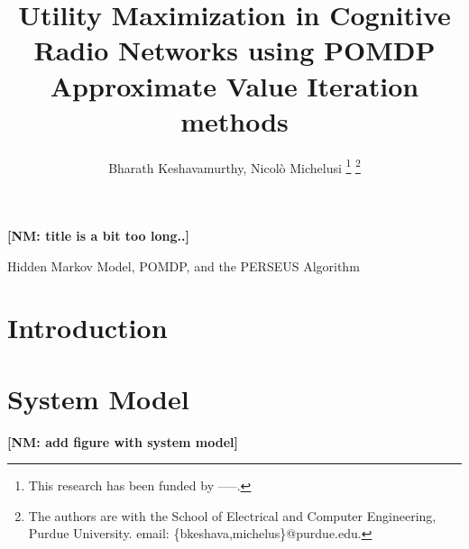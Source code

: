 \documentclass[10pt,twocolumn]{IEEEtran}
\title{Utility Maximization in Cognitive Radio Networks using POMDP Approximate Value Iteration methods}
\author{Bharath Keshavamurthy, Nicol\`{o} Michelusi
\thanks{This research has been funded by -----.}
\thanks{The authors are with the School of Electrical and Computer Engineering, Purdue University. email: \{bkeshava,michelus\}@purdue.edu.}
}
\newcommand{\nm}[1]{{\color{blue}\bf{[NM: #1]}}}
\begin{document}
 
\maketitle
{}
\nm{title is a bit too long..}

\begin{abstract}
\end{abstract}

\begin{IEEEkeywords}
Hidden Markov Model, POMDP, and the PERSEUS Algorithm
\end{IEEEkeywords}

\section{Introduction}
\section{System Model}
\nm{add figure with system model}
\end{document}
